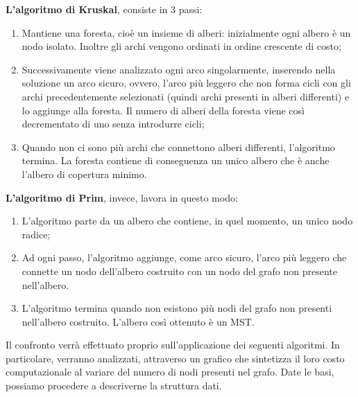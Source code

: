 \documentclass{article}
\begin{document}
\textbf{L'algoritmo di Kruskal}, consiste in 3 passi:
\begin{enumerate}[label={\roman*.)}, ref={\roman*.)}]
    \item Mantiene una foresta, cioè un insieme di alberi: inizialmente ogni albero è un nodo isolato.
    Inoltre gli archi vengono ordinati in ordine crescente di costo;
    \item Successivamente viene analizzato ogni arco singolarmente, inserendo nella soluzione un arco sicuro, ovvero, l’arco più leggero che non forma cicli con gli archi precedentemente selezionati (quindi archi presenti in alberi differenti) e lo aggiunge alla foresta. Il numero di alberi della foresta viene così decrementato di uno senza introdurre cicli;
    \item Quando non ci sono più archi che connettono alberi differenti, l’algoritmo termina. La foresta contiene di conseguenza un unico albero che è anche l'albero di copertura minimo.
\end{enumerate}
\textbf{L'algoritmo di Prim}, invece, lavora in questo modo:
\begin{enumerate}[label={\roman*.)}, ref={\roman*.)}]
    \item L'algoritmo parte da un albero che contiene, in quel momento, un unico nodo radice;
    \item Ad ogni passo, l’algoritmo aggiunge, come arco sicuro, l’arco più leggero che connette un nodo dell’albero costruito con un nodo del grafo non presente nell’albero.
    \item L'algoritmo termina quando non esistono più nodi del grafo non presenti nell’albero costruito. L’albero così ottenuto è un MST.
\end{enumerate}
Il confronto verrà effettuato proprio sull'applicazione dei seguenti algoritmi. In particolare, verranno analizzati, attraverso un grafico che sintetizza il loro costo computazionale al variare del numero di nodi presenti nel grafo.
Date le basi, possiamo procedere a descriverne la struttura dati.

\end{document}
